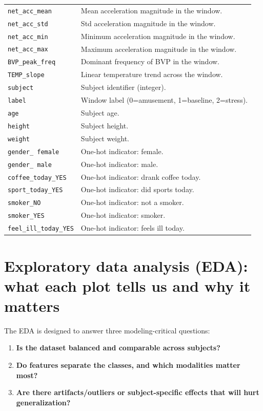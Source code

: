 \documentclass[11pt]{article}
\begin{document}
\begin{longtable}{@{}p{}p{}@{}}
\texttt{net\_acc\_mean} & Mean acceleration magnitude in the window. \\
\texttt{net\_acc\_std} & Std acceleration magnitude in the window. \\
\texttt{net\_acc\_min} & Minimum acceleration magnitude in the window. \\
\texttt{net\_acc\_max} & Maximum acceleration magnitude in the window. \\

\texttt{BVP\_peak\_freq} & Dominant frequency of BVP in the window. \\
\texttt{TEMP\_slope} & Linear temperature trend across the window. \\

\texttt{subject} & Subject identifier (integer). \\
\texttt{label} & Window label (0=amusement, 1=baseline, 2=stress). \\

\texttt{age} & Subject age. \\
\texttt{height} & Subject height. \\
\texttt{weight} & Subject weight. \\

\texttt{gender\_ female} & One-hot indicator: female. \\
\texttt{gender\_ male} & One-hot indicator: male. \\
\texttt{coffee\_today\_YES} & One-hot indicator: drank coffee today. \\
\texttt{sport\_today\_YES} & One-hot indicator: did sports today. \\
\texttt{smoker\_NO} & One-hot indicator: not a smoker. \\
\texttt{smoker\_YES} & One-hot indicator: smoker. \\
\texttt{feel\_ill\_today\_YES} & One-hot indicator: feels ill today. \\

\end{longtable}

\section{Exploratory data analysis (EDA): what each plot tells us and why it matters}
The EDA is designed to answer three modeling-critical questions:
\begin{enumerate}
  \item \textbf{Is the dataset balanced and comparable across subjects?}
  \item \textbf{Do features separate the classes, and which modalities matter most?}
  \item \textbf{Are there artifacts/outliers or subject-specific effects that will hurt generalization?}
\end{enumerate}
\end{document}
